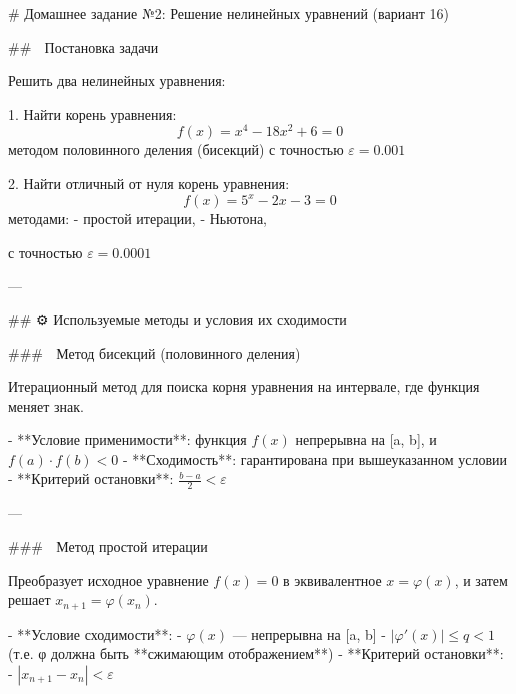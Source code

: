 # Домашнее задание №2: Решение нелинейных уравнений (вариант 16)

## 📌 Постановка задачи

Решить два нелинейных уравнения:

1. Найти корень уравнения:
   \[
   f(x) = x^4 - 18x^2 + 6 = 0
   \]
   методом половинного деления (бисекций) с точностью \( \varepsilon = 0.001 \)

2. Найти отличный от нуля корень уравнения:
   \[
   f(x) = 5^x - 2x - 3 = 0
   \]
   методами:
   - простой итерации,
   - Ньютона,
   
   с точностью \( \varepsilon = 0.0001 \)

---

## ⚙️ Используемые методы и условия их сходимости

### 🔹 Метод бисекций (половинного деления)

Итерационный метод для поиска корня уравнения на интервале, где функция меняет знак.

- **Условие применимости**: функция \( f(x) \) непрерывна на [a, b], и \( f(a) \cdot f(b) < 0 \)
- **Сходимость**: гарантирована при вышеуказанном условии
- **Критерий остановки**: \( \frac{b - a}{2} < \varepsilon \)

---

### 🔹 Метод простой итерации

Преобразует исходное уравнение \( f(x) = 0 \) в эквивалентное \( x = \varphi(x) \), и затем решает \( x_{n+1} = \varphi(x_n) \).

- **Условие сходимости**:
  - \( \varphi(x) \) — непрерывна на [a, b]
  - \( |\varphi'(x)| \leq q < 1 \) (т.е. φ должна быть **сжимающим отображением**)
- **Критерий остановки**:
  - \( |x_{n+1} - x_n| < \varepsilon \)

---

### 🔹 Метод Ньютона

Итерационный метод с квадратичной скоростью сходимости:

\[
x_{n+1} = x_n - \frac{f(x_n)}{f'(x_n)}
\]

- **Условия сходимости**:
  - \( f(x) \in C^2[a,b] \)
  - \( f'(x_0) \ne 0 \)
  - начальное приближение достаточно близко к корню
- **Критерий остановки**:
  - \( |x_{n+1} - x_n| < \varepsilon \)

---

## ✅ Как мы подбирали φ(x)

Для уравнения:
\[
5^x - 2x - 3 = 0
\]

Наивная попытка взять:
\[
x = \varphi(x) = \frac{5^x - 3}{2}
\]
оказалась **неудачной**: при \( x_0 = 2 \) уже на втором шаге возникает переполнение (OverflowError), т.к. \( 5^x \) растёт слишком быстро.

